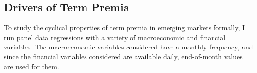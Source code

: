 %
%

\subsection{Drivers of Term Premia}
To study the cyclical properties of term premia in emerging markets formally, I run  panel data regressions with a variety of macroeconomic and financial variables. The macroeconomic variables considered have a monthly frequency, and since the financial variables considered are available daily, end-of-month values are used for them.

